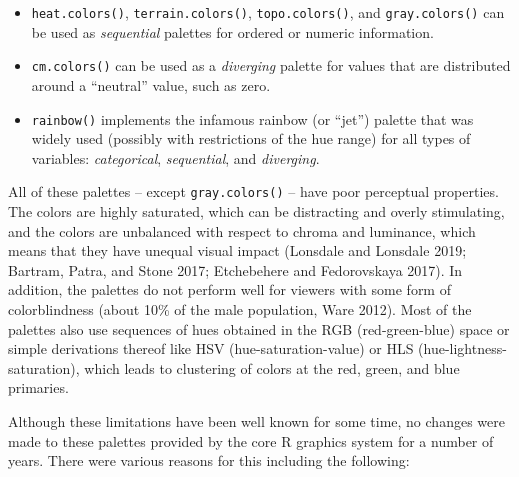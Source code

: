 \begin{itemize}
\tightlist
\item
  \texttt{heat.colors()}, \texttt{terrain.colors()}, \texttt{topo.colors()}, and \texttt{gray.colors()}
  can be used as \emph{sequential} palettes for ordered or numeric information.
\item
  \texttt{cm.colors()} can be used as a \emph{diverging} palette for values that are
  distributed around a ``neutral'' value, such as zero.
\item
  \texttt{rainbow()} implements the infamous rainbow (or ``jet'') palette
  that was widely used (possibly with restrictions of the hue range)
  for all types of variables: \emph{categorical}, \emph{sequential}, and \emph{diverging}.
\end{itemize}

All of these palettes -- except \texttt{gray.colors()} -- have poor perceptual properties.
The colors are highly saturated, which can be distracting and overly
stimulating, and the colors are unbalanced with respect to chroma and luminance,
which means that they have unequal visual impact
(Lonsdale and Lonsdale 2019; Bartram, Patra, and Stone 2017; Etchebehere and Fedorovskaya 2017).
In addition, the palettes do not perform well for viewers with some form
of colorblindness (about 10\% of the male population, Ware 2012).
Most of the palettes also use sequences
of hues obtained in the RGB (red-green-blue) space or simple derivations thereof like HSV (hue-saturation-value) or HLS (hue-lightness-saturation),
which leads to clustering of colors at the red, green, and blue primaries.

Although these limitations have been well known for some time, no changes
were made to these palettes provided by the core R graphics system for
a number of years. There were various reasons for this including the following:


